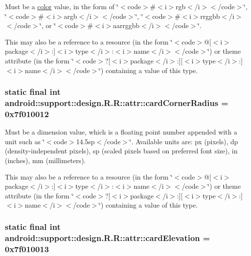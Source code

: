 Must be a \hyperlink{classandroid_1_1support_1_1design_1_1_r_1_1color}{color} value, in the form of \char`\"{}$<$code$>$\#$<$i$>$rgb$<$/i$>$$<$/code$>$\char`\"{}, \char`\"{}$<$code$>$\#$<$i$>$argb$<$/i$>$$<$/code$>$\char`\"{}, \char`\"{}$<$code$>$\#$<$i$>$rrggbb$<$/i$>$$<$/code$>$\char`\"{}, or \char`\"{}$<$code$>$\#$<$i$>$aarrggbb$<$/i$>$$<$/code$>$\char`\"{}. 

This may also be a reference to a resource (in the form \char`\"{}$<$code$>$@\mbox{[}$<$i$>$package$<$/i$>$:\mbox{]}$<$i$>$type$<$/i$>$:$<$i$>$name$<$/i$>$$<$/code$>$\char`\"{}) or theme attribute (in the form \char`\"{}$<$code$>$?\mbox{[}$<$i$>$package$<$/i$>$:\mbox{]}\mbox{[}$<$i$>$type$<$/i$>$:\mbox{]}$<$i$>$name$<$/i$>$$<$/code$>$\char`\"{}) containing a value of this type. \hypertarget{classandroid_1_1support_1_1design_1_1_r_1_1attr_a878a36317f9ad9ff093b8c7dfd5198d}{
\subsubsection[{cardCornerRadius}]{\setlength{\rightskip}{0pt plus 5cm}static final int android::support::design.R.R::attr::cardCornerRadius = 0x7f010012}}
\label{classandroid_1_1support_1_1design_1_1_r_1_1attr_a878a36317f9ad9ff093b8c7dfd5198d}


Must be a dimension value, which is a floating point number appended with a unit such as \char`\"{}$<$code$>$14.5sp$<$/code$>$\char`\"{}. Available units are: px (pixels), dp (density-independent pixels), sp (scaled pixels based on preferred font size), in (inches), mm (millimeters). 

This may also be a reference to a resource (in the form \char`\"{}$<$code$>$@\mbox{[}$<$i$>$package$<$/i$>$:\mbox{]}$<$i$>$type$<$/i$>$:$<$i$>$name$<$/i$>$$<$/code$>$\char`\"{}) or theme attribute (in the form \char`\"{}$<$code$>$?\mbox{[}$<$i$>$package$<$/i$>$:\mbox{]}\mbox{[}$<$i$>$type$<$/i$>$:\mbox{]}$<$i$>$name$<$/i$>$$<$/code$>$\char`\"{}) containing a value of this type. \hypertarget{classandroid_1_1support_1_1design_1_1_r_1_1attr_67de2c4eb29b8ccf1a83da2986490b84}{
\subsubsection[{cardElevation}]{\setlength{\rightskip}{0pt plus 5cm}static final int android::support::design.R.R::attr::cardElevation = 0x7f010013}}
\label{classandroid_1_1support_1_1design_1_1_r_1_1attr_67de2c4eb29b8ccf1a83da2986490b84}


